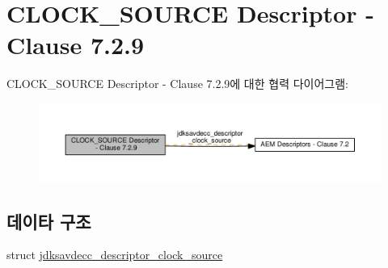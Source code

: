 \hypertarget{group__descriptor__clock__source}{}\section{C\+L\+O\+C\+K\+\_\+\+S\+O\+U\+R\+CE Descriptor -\/ Clause 7.2.9}
\label{group__descriptor__clock__source}
C\+L\+O\+C\+K\+\_\+\+S\+O\+U\+R\+CE Descriptor -\/ Clause 7.2.9에 대한 협력 다이어그램\+:
\nopagebreak
\begin{figure}[H]
\begin{center}
\leavevmode
\includegraphics[width=350pt]{group__descriptor__clock__source}
\end{center}
\end{figure}
\subsection*{데이타 구조}
\begin{DoxyCompactItemize}
\item 
struct \hyperlink{structjdksavdecc__descriptor__clock__source}{jdksavdecc\+\_\+descriptor\+\_\+clock\+\_\+source}
\end{DoxyCompactItemize}

